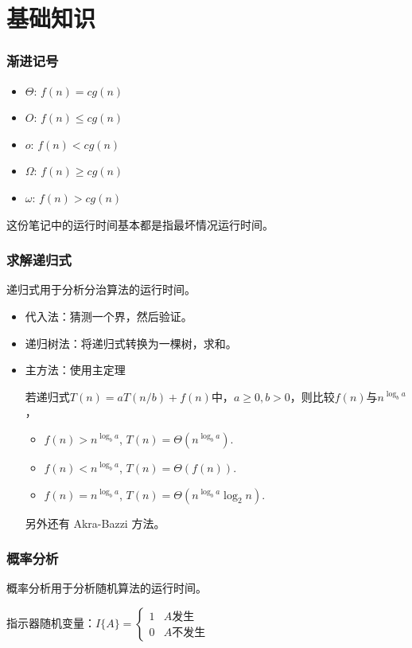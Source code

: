 \section{基础知识}
\subsubsection*{渐进记号}
\begin{itemize}
    \item $\Theta$: $f(n) = cg(n)$
    \item $O$: $f(n) \le cg(n)$
    \item $o$: $f(n) < cg(n)$
    \item $\Omega$: $f(n) \ge cg(n)$
    \item $\omega$: $f(n) > cg(n)$
\end{itemize}
这份笔记中的运行时间基本都是指最坏情况运行时间。

\subsubsection*{求解递归式}
递归式用于分析分治算法的运行时间。
\begin{itemize}
    \item 代入法：猜测一个界，然后验证。
    \item 递归树法：将递归式转换为一棵树，求和。
    \item 主方法：使用主定理

    若递归式$T(n) = aT(n/b) + f(n)$中，$a \ge 0, b > 0$，则比较$f(n)$与$n^{\log _b a}$，
    \begin{itemize}
        \item $f(n) > n^{\log _b a}$, $T(n) = \Theta (n^{\log _b a})$.
        \item $f(n) < n^{\log _b a}$, $T(n) = \Theta (f(n))$.
        \item $f(n) = n^{\log _b a}$, $T(n) = \Theta (n^{\log _b a} \log _2 n)$.
    \end{itemize}

    另外还有 Akra-Bazzi 方法。
\end{itemize}

\subsubsection*{概率分析}
概率分析用于分析随机算法的运行时间。

指示器随机变量：$I\{A\} = \begin{cases} 1 & A \text{发生}\\ 0 & A \text{不发生} \end{cases}$

